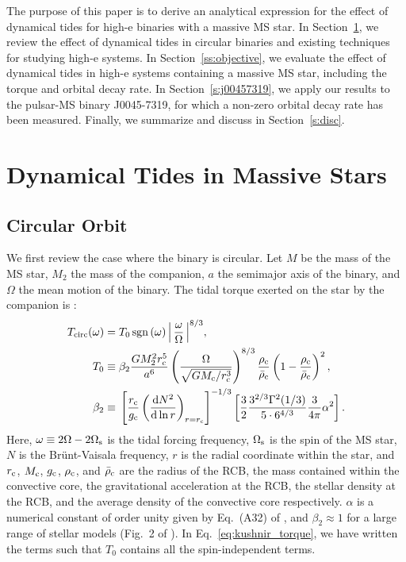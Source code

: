 \documentclass[
        fleqn,
        usenatbib,
    ]{mnras}
\newcommand*{\rd}[2]{\frac{\mathrm{d}#1}{\mathrm{d}#2}}
\newcommand*{\p}[1]{\left(#1\right)}
\newcommand*{\s}[1]{\left[#1\right]}
\DeclareMathOperator*{\sgn}{sgn}
\begin{document}
The purpose of this paper is to derive an analytical expression for the effect
of dynamical tides for high-e binaries with a massive MS star. In
Section~\ref{s:background}, we review the effect of dynamical tides in circular
binaries and existing techniques for studying high-e systems. In
Section~\ref{ss:objective}, we evaluate the effect of dynamical tides in
high-e systems containing a massive MS star, including the torque and orbital
decay rate. In Section~\ref{s:j00457319}, we apply our results to the pulsar-MS
binary J0045-7319, for which a non-zero orbital decay rate has been measured.
Finally, we summarize and discuss in Section~\ref{s:disc}.

\section{Dynamical Tides in Massive Stars}\label{s:background}

\subsection{Circular Orbit}\label{ss:2_circ}

We first review the case where the binary is circular. Let $M$ be the mass of
the MS star, $M_2$ the mass of the companion, $a$ the semimajor axis of the binary, and
$\Omega$ the mean motion of the binary. The tidal torque exerted on the star by
the companion is \citep{kushnir}:
\begin{align}
    T_{\rm circ}(\omega) ={}& T_0 \sgn\p{\omega}
        \Big|\,\frac{\omega}{\Omega}\,\Big|^{8/3} \label{eq:kushnir_torque},\\
    T_0 \equiv{}& \beta_2\frac{GM_2^2r_{\rm c}^5}{a^6}
            \p{\frac{\Omega}{\sqrt{GM_{\rm c}/r_{\rm c}^3}}}^{8/3}
            \frac{\rho_{\rm c}}{\bar{\rho}_{\rm c}} \p{1 - \frac{\rho_{\rm
            c}}{\bar{\rho}_{\rm c}}}^2,\\
    \beta_2 \equiv{}&
        \s{\frac{r_{\rm c}}{g_{\rm c}}
            \p{\rd{N^2}{\ln r}}_{r = r_{\rm c}}}^{-1/3}
                \s{\frac{3}{2}\frac{3^{2/3}\Gamma^2(1/3)}{5 \cdot
                6^{4/3}} \frac{3}{4\pi}\alpha^2}.
\end{align}
Here, $\omega \equiv 2\Omega - 2\Omega_{\rm s}$ is the tidal forcing frequency,
$\Omega_{\rm s}$ is the spin of the MS star, $N$ is the Br\"unt-Vaisala
frequency, $r$ is the radial coordinate within the star, and $r_{\rm c}$,
$M_{\rm c}$, $g_{\rm c}$, $\rho_{\rm c}$, and $\bar{\rho}_{\rm c}$ are the
radius of the RCB, the mass contained within the convective core, the
gravitational acceleration at the RCB, the stellar density at the RCB, and the
average density of the convective core respectively. $\alpha$ is a numerical
constant of order unity given by Eq.~(A32) of \citet{kushnir}, and $\beta_2
\approx 1$ for a large range of stellar models (Fig.~2 of \citealp{kushnir}). In
Eq.~\eqref{eq:kushnir_torque}, we have written the terms such that $T_0$
contains all the spin-independent terms.
\end{document}
